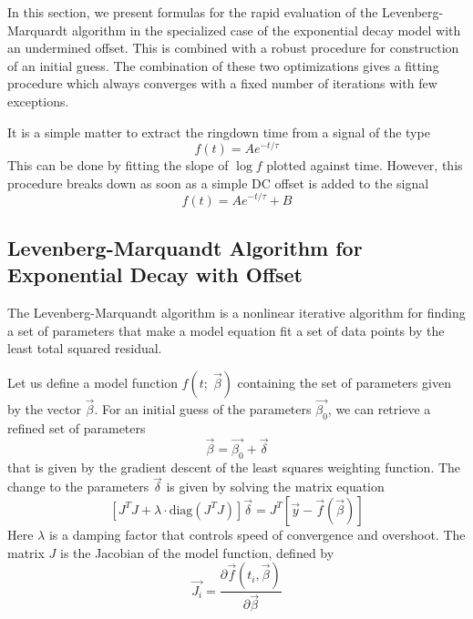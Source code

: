 In this section, we present formulas for the rapid evaluation of the Levenberg-Marquardt algorithm in the specialized case of the exponential decay model with an undermined offset. This is combined with a robust procedure for construction of an initial guess. The combination of these two optimizations gives a fitting procedure which always converges with a fixed number of iterations with few exceptions.

It is a simple matter to extract the ringdown time from a signal of the type
\begin{equation}\label{noOffsetModel}
	f(t) = A e^{-t/\tau}
\end{equation}
This can be done by fitting the slope of $\log f$ plotted against time. However, this procedure breaks down as soon as a simple DC offset is added to the signal
\begin{equation}\label{model}
	f(t) = A e^{-t/\tau} + B
\end{equation}

\subsection{Levenberg-Marquandt Algorithm for Exponential Decay with Offset}

The Levenberg-Marquandt algorithm is a nonlinear iterative algorithm for finding a set of parameters that make a model equation fit a set of data points by the least total squared residual. %

Let us define a model function $f(t;\; \vec{\beta} )$ containing the set of parameters given by the vector $\vec{\beta}$. For an initial guess of the parameters $\vec{\beta_0}$, we can retrieve a refined set of parameters
\begin{equation}\label{lmfit_iterationEqn}
	\vec{\beta} = \vec{\beta_0} + \vec{\delta}
\end{equation}
that is given by the gradient descent of the least squares weighting function. The change to the parameters $\vec{\delta}$ is given by solving the matrix equation
\begin{equation}\label{lmfit_matrixSolve}
	\left[ J^T J + \lambda\cdot\text{diag}\left( J^T J \right) \right] \vec{\delta} = J^T \left[\vec{y} - \vec{f}(\vec{\beta}) \right]
\end{equation}
Here $\lambda$ is a damping factor that controls speed of convergence and overshoot. The matrix $J$ is the Jacobian of the model function, defined by
\begin{equation}
	\vec{J_i} = \frac{\partial \vec{f}(t_i,\vec{\beta})}{\partial \vec{\beta}}
\end{equation}

